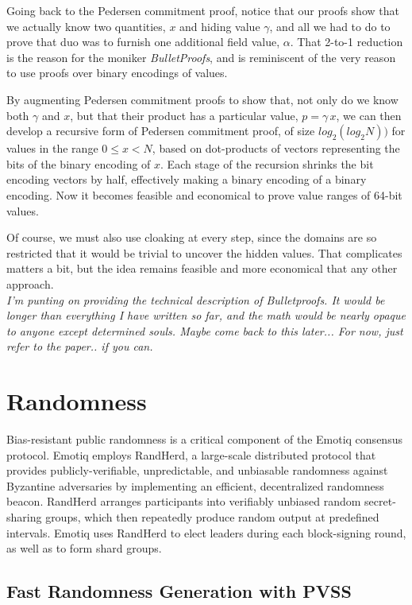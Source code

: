 \documentclass{yellowpaper}
\begin{document}
Going back to the Pedersen commitment proof, notice that our proofs show that we actually know two quantities, $x$ and hiding value $\gamma$, and all we had to do to prove that duo was to furnish one additional field value, $\alpha$. That 2-to-1 reduction is the reason for the moniker {\em{BulletProofs}}, and is reminiscent of the very reason to use proofs over binary encodings of values. 

By augmenting Pedersen commitment proofs to show that, not only do we know both $\gamma$ and $x$, but that their product has a particular value, $p = \gamma \, x$, we can then develop a recursive form of Pedersen commitment proof, of size $log_2(log_2 N))$ for values in the range $0 \le x < N$, based on dot-products of vectors representing the bits of the binary encoding of $x$. Each stage of the recursion shrinks the bit encoding vectors by half, effectively making a binary encoding of a binary encoding. Now it becomes feasible and economical to prove value ranges of 64-bit values.

Of course, we must also use cloaking at every step, since the domains are so restricted that it would be trivial to uncover the hidden values. That complicates matters a bit, but the idea remains feasible and more economical that any other approach.
$$
$$
{\em{I'm punting on providing the technical description of Bulletproofs. It would be longer than everything I have written so far, and the math would be nearly opaque to anyone except determined souls. Maybe come back to this later... For now, just refer to the paper.. if you can.}}
$$
$$
\section{Randomness}
Bias-resistant public randomness is a critical component of the Emotiq consensus protocol. Emotiq employs RandHerd, a large-scale distributed protocol that provides publicly-verifiable, unpredictable, and unbiasable randomness against Byzantine adversaries by implementing an efficient, decentralized randomness beacon. RandHerd arranges participants into verifiably unbiased random
secret-sharing groups, which then repeatedly produce random output at predefined intervals. Emotiq uses RandHerd to elect leaders during each block-signing round, as well as to form shard groups.
\subsection{Fast Randomness Generation with PVSS}
\end{document}
